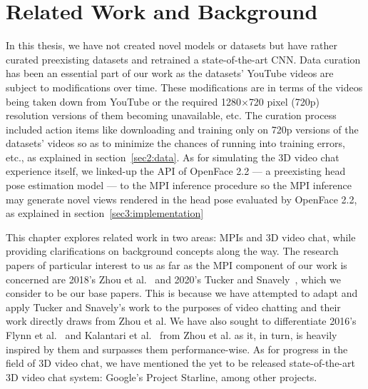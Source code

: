 \chapter{Related Work and Background}\label{ch2:related-work-background}

In this thesis, we have not created novel models or datasets but have rather curated preexisting datasets and retrained a state-of-the-art CNN. Data curation has been an essential part of our work as the datasets' YouTube videos are subject to modifications over time. These modifications are in terms of the videos being taken down from YouTube or the required 1280$\times$720 pixel (720p) resolution versions of them becoming unavailable, etc. The curation process included action items like downloading and training only on 720p versions of the datasets' videos so as to minimize the chances of running into training errors, etc., as explained in section~\ref{sec2:data}. As for simulating the 3D video chat experience itself, we linked-up the API of OpenFace 2.2 --- a preexisting head pose estimation model --- to the MPI inference procedure so the MPI inference may generate novel views rendered in the head pose evaluated by OpenFace 2.2, as explained in section~\ref{sec3:implementation}

This chapter explores related work in two areas: MPIs and 3D video chat, while providing clarifications on background concepts along the way. The research papers of particular interest to us as far as the MPI component of our work is concerned are 2018's Zhou et al.~\cite{zhou2018stereo} and 2020's Tucker and Snavely~\cite{single_view_mpi}, which we consider to be our base papers. This is because we have attempted to adapt and apply Tucker and Snavely's work to the purposes of video chatting and their work directly draws from Zhou et al. We have also sought to differentiate 2016's Flynn et al.~\cite{deep_stereo_2016} and Kalantari et al.~\cite{kalantari_2016} from Zhou et al. as it, in turn, is heavily inspired by them and surpasses them performance-wise. As for progress in the field of 3D video chat, we have mentioned the yet to be released state-of-the-art 3D video chat system: Google's Project Starline, among other projects.


